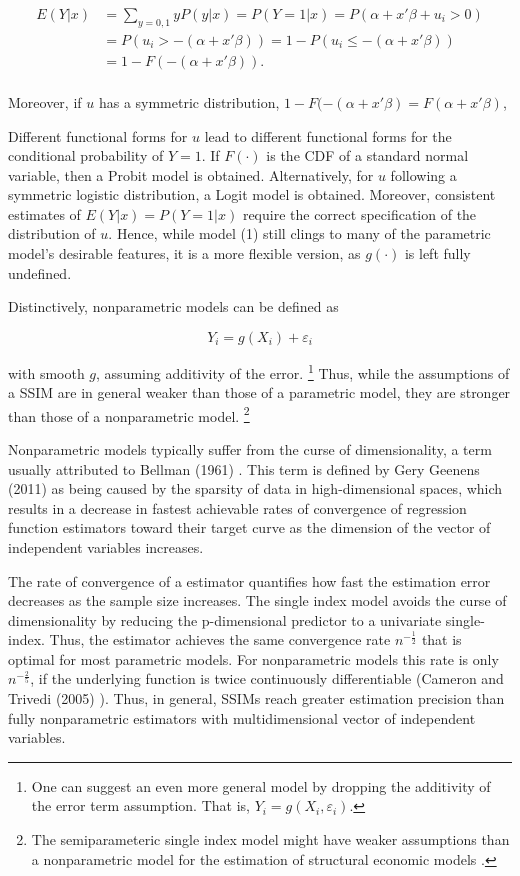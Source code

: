 \[ 
\begin{split}
E(Y|x) & = \sum_{y=0,1} yP(y|x) = P(Y=1|x) = P(\alpha + x'\beta + u_i > 0) \\
 & = P(u_i > -(\alpha + x'\beta)) = 1 - P(u_i \leq -(\alpha + x'\beta)) \\
 & = 1 - F(-(\alpha + x'\beta)). \\
\end{split}
\]


Moreover, if $u$ has a symmetric distribution, $1 - F(-(\alpha + x'\beta) = F(\alpha + x'\beta)$, 

Different functional forms for $u$ lead to different functional forms for the conditional probability of $Y = 1$. If $F(\cdot)$ is the CDF of a standard normal variable, then a Probit model is obtained. Alternatively, for $u$ following a symmetric logistic distribution, a Logit model is obtained. Moreover, consistent estimates of $E(Y|x)=P(Y=1|x)$ require the correct specification of the distribution of $u$. 
Hence, while model (1) still clings to many of the parametric model's desirable features, it is a more flexible version, as $g(\cdot)$ is left fully undefined.

Distinctively, nonparametric models can be defined as
  
\[Y_i = g(X_i) + \varepsilon_i\]

with smooth $g$, assuming additivity of the error. \footnote{One can suggest an even more general model by dropping the additivity of the error term assumption. That is, $Y_i = g(X_i, \varepsilon_i) $. } Thus, while the assumptions of a SSIM are in general weaker than those of a parametric model, they are stronger than those of a nonparametric model. \footnote{The semiparameteric single index model might have weaker assumptions than a nonparametric model for the estimation of structural economic models \cite{[13]}.} 

Nonparametric models typically suffer from the curse of dimensionality, a term usually attributed to Bellman (1961) \cite{[3]}. This term is defined by Gery Geenens (2011) \cite{[4]} as being caused by the sparsity of data in high-dimensional spaces, which results in a decrease in fastest achievable rates of convergence of regression function estimators toward their target curve as the dimension of the vector of independent variables increases. 

The rate of convergence of a estimator quantifies how fast the estimation error decreases as the sample size increases. The single index model avoids the curse of dimensionality by reducing the p-dimensional predictor to a univariate single-index. Thus, the estimator achieves the same convergence rate $n^{-\frac{1}{2}}$ that is optimal for most parametric models. For nonparametric models this rate is only $n^{-\frac{2}{5}}$, if the underlying function is twice continuously differentiable (Cameron and Trivedi (2005) \cite{[5]}).
Thus, in general, SSIMs reach greater estimation precision than fully nonparametric estimators with multidimensional vector of independent variables.



